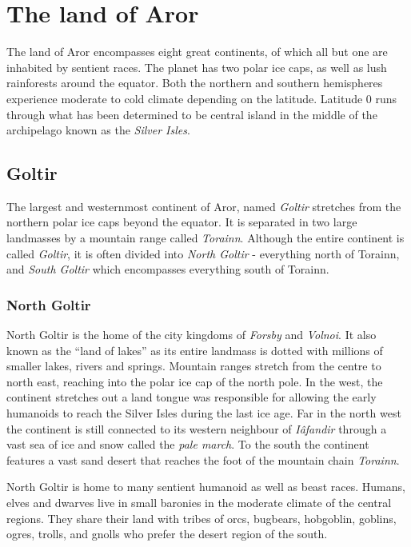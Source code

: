 \section*{The land of Aror}

The land of Aror encompasses eight great continents, of which all but one are
inhabited by sentient races. The planet has two polar ice caps, as well as lush
rainforests around the equator. Both the northern and southern hemispheres
experience moderate to cold climate depending on the latitude. Latitude 0 runs
through what has been determined to be central island in the middle of the
archipelago known as the \emph{Silver Isles}.

\subsection*{Goltir}

The largest and westernmost continent of Aror, named \emph{Goltir} stretches
from the northern polar ice caps beyond the equator. It is separated in two
large landmasses by a mountain range called \emph{Torainn}. Although the
entire continent is called \emph{Goltir}, it is often divided into \emph{North
  Goltir} - everything north of Torainn, and \emph{South Goltir} which
encompasses everything south of Torainn.

\subsubsection{North Goltir}

North Goltir is the home of the city kingdoms of \emph{Forsby} and
\emph{Volnoi}. It also known as the ``land of lakes'' as its entire landmass
is dotted with millions of smaller lakes, rivers and springs. Mountain ranges
stretch from the centre to north east, reaching into the polar ice cap of the
north pole. In the west, the continent stretches out a land tongue was
responsible for allowing the early humanoids to reach the Silver Isles during
the last ice age. Far in the north west the continent is still connected to
its western neighbour of \emph{Iâfandir} through a vast sea of ice and snow
called the \emph{pale march}. To the south the continent features a vast sand
desert that reaches the foot of the mountain chain \emph{Torainn}.

North Goltir is home to many sentient humanoid as well as beast races. Humans,
elves and dwarves live in small baronies in the moderate climate of the
central regions. They share their land with tribes of orcs, bugbears,
hobgoblin, goblins, ogres, trolls, and gnolls who prefer the desert region of
the south.

